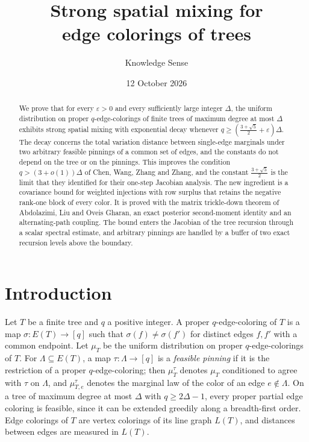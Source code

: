 \documentclass{amsart}
\numberwithin{equation}{section}
\theoremstyle{plain}
\theoremstyle{definition}
\theoremstyle{remark}
\begin{document}
\title[Strong spatial mixing for edge colorings of trees]{Strong spatial mixing for\\ edge colorings of trees}

\author{Knowledge Sense}
\address{Knowledge Sense}

\date{12 October 2026}



\begin{abstract}
We prove that for every $\varepsilon>0$ and every sufficiently large integer $\Delta$, the uniform distribution on proper $q$-edge-colorings of finite trees of maximum degree at most $\Delta$ exhibits strong spatial mixing with exponential decay whenever $q\ge(\frac{3+\sqrt5}{2}+\varepsilon)\Delta$. The decay concerns the total variation distance between single-edge marginals under two arbitrary feasible pinnings of a common set of edges, and the constants do not depend on the tree or on the pinnings. This improves the condition $q>(3+o(1))\Delta$ of Chen, Wang, Zhang and Zhang, and the constant $\frac{3+\sqrt5}{2}$ is the limit that they identified for their one-step Jacobian analysis. The new ingredient is a covariance bound for weighted injections with row surplus that retains the negative rank-one block of every color. It is proved with the matrix trickle-down theorem of Abdolazimi, Liu and Oveis Gharan, an exact posterior second-moment identity and an alternating-path coupling. The bound enters the Jacobian of the tree recursion through a scalar spectral estimate, and arbitrary pinnings are handled by a buffer of two exact recursion levels above the boundary.
\end{abstract}

\maketitle

\section{Introduction}

Let $T$ be a finite tree and $q$ a positive integer. A proper $q$-edge-coloring of $T$ is a map $\sigma\colon E(T)\to[q]$ such that $\sigma(f)\ne\sigma(f')$ for distinct edges $f,f'$ with a common endpoint. Let $\mu_T$ be the uniform distribution on proper $q$-edge-colorings of $T$. For $\Lambda\subseteq E(T)$, a map $\tau\colon\Lambda\to[q]$ is a \emph{feasible pinning} if it is the restriction of a proper $q$-edge-coloring; then $\mu_T^\tau$ denotes $\mu_T$ conditioned to agree with $\tau$ on $\Lambda$, and $\mu_{T,e}^\tau$ denotes the marginal law of the color of an edge $e\notin\Lambda$. On a tree of maximum degree at most $\Delta$ with $q\ge2\Delta-1$, every proper partial edge coloring is feasible, since it can be extended greedily along a breadth-first order. Edge colorings of $T$ are vertex colorings of its line graph $L(T)$, and distances between edges are measured in $L(T)$.
\end{document}
